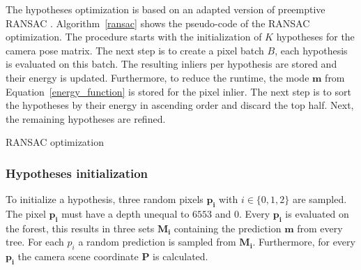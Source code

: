 \documentclass[final]{cvpr}
\begin{document}
The hypotheses optimization is based on an adapted version of preemptive RANSAC \cite{shotton2013}.
Algorithm~\ref{ransac} shows the pseudo-code of the RANSAC optimization.
The procedure starts with the initialization of $K$ hypotheses for the camera pose matrix. 
The next step is to create a pixel batch $B$,
each hypothesis is evaluated on this batch. The resulting inliers per hypothesis  are stored and their energy is 
updated. Furthermore, to reduce the runtime, the mode $\boldsymbol{m}$ from Equation~\ref{energy_function} is stored for
the pixel inlier.
The next step is to sort the hypotheses by their energy in ascending order and discard the top half. Next, the remaining hypotheses are refined.

\begin{algorithm}
	\caption{RANSAC optimization}
	\label{ransac}
\end{algorithm}

\subsubsection{Hypotheses initialization}
To initialize a hypothesis, three random pixels $$ with $i \in \{0,1,2\}$ are sampled. The pixel $$ must have a depth unequal to $6553$ and $0$. Every $$ is evaluated on the forest, this results in three sets 
$$ containing the prediction $$ from every tree. For each $p_{i}$ a random prediction is sampled from $$. Furthermore, for every $$ the camera scene coordinate $$ is calculated.
\end{document}

